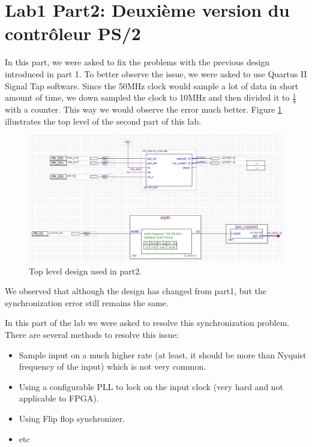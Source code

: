 \documentclass{rapportECL}
\begin{document}
\section{Lab1 Part2: Deuxième version du contrôleur PS/2}
In this part, we were asked to fix the problems with the previous design introduced in part 1. To better observe the issue, we were asked to use Quartus II Signal Tap software. Since the 50MHz clock would sample a lot of data in short amount of time, we down sampled the clock to 10MHz and then divided it to $\frac{1}{8}$ with a counter. This way we would observe the error much better. Figure \ref{fig:part2_top} illustrates the top level of the second part of this lab.

\begin{figure}[H]
    \centering
    \includegraphics[width=15cm]{logos/part2_top.jpg}
    \caption{Top level design used in part2.}
    \label{fig:part2_top}
\end{figure}

We observed that although the design has changed from part1, but the synchronization error still remains the same. 



In this part of the lab we were asked to resolve this synchronization problem. There are several methods to resolve this issue:

\begin{itemize}
    \item Sample input on a much higher rate (at least, it should be more than Nyquist frequency of the input) which is not very common.
    \item Using a configurable PLL to lock on the input clock (very hard and not applicable to FPGA).
    \item Using Flip flop synchronizer.
    \item etc
\end{itemize}
\end{document}
